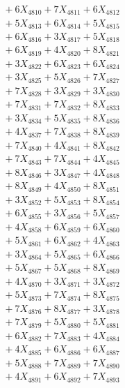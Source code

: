 \documentclass[a4paper,10pt]{article}
\begin{document}
{\begin{align}
&\;  + 6 X_{4810} + 7 X_{4811} + 6 X_{4812} \\[0.3ex]
&\;  + 5 X_{4813} + 6 X_{4814} + 5 X_{4815} \\[0.3ex]
&\;  + 6 X_{4816} + 3 X_{4817} + 5 X_{4818} \\[0.3ex]
&\;  + 6 X_{4819} + 4 X_{4820} + 8 X_{4821} \\[0.3ex]
&\;  + 3 X_{4822} + 6 X_{4823} + 6 X_{4824} \\[0.3ex]
&\;  + 3 X_{4825} + 5 X_{4826} + 7 X_{4827} \\[0.3ex]
&\;  + 7 X_{4828} + 3 X_{4829} + 3 X_{4830} \\[0.3ex]
&\;  + 7 X_{4831} + 7 X_{4832} + 8 X_{4833} \\[0.3ex]
&\;  + 3 X_{4834} + 5 X_{4835} + 8 X_{4836} \\[0.3ex]
&\;  + 4 X_{4837} + 7 X_{4838} + 8 X_{4839} \\[0.5ex]\allowbreak
&\;  + 7 X_{4840} + 4 X_{4841} + 8 X_{4842} \\[0.3ex]
&\;  + 7 X_{4843} + 7 X_{4844} + 4 X_{4845} \\[0.3ex]
&\;  + 8 X_{4846} + 3 X_{4847} + 4 X_{4848} \\[0.3ex]
&\;  + 8 X_{4849} + 4 X_{4850} + 8 X_{4851} \\[0.3ex]
&\;  + 3 X_{4852} + 5 X_{4853} + 8 X_{4854} \\[0.3ex]
&\;  + 6 X_{4855} + 3 X_{4856} + 5 X_{4857} \\[0.3ex]
&\;  + 4 X_{4858} + 6 X_{4859} + 6 X_{4860} \\[0.3ex]
&\;  + 5 X_{4861} + 6 X_{4862} + 4 X_{4863} \\[0.3ex]
&\;  + 3 X_{4864} + 5 X_{4865} + 6 X_{4866} \\[0.3ex]
&\;  + 5 X_{4867} + 5 X_{4868} + 8 X_{4869} \\[0.5ex]\allowbreak
&\;  + 4 X_{4870} + 3 X_{4871} + 3 X_{4872} \\[0.3ex]
&\;  + 5 X_{4873} + 7 X_{4874} + 8 X_{4875} \\[0.3ex]
&\;  + 7 X_{4876} + 8 X_{4877} + 3 X_{4878} \\[0.3ex]
&\;  + 7 X_{4879} + 5 X_{4880} + 5 X_{4881} \\[0.3ex]
&\;  + 6 X_{4882} + 7 X_{4883} + 4 X_{4884} \\[0.3ex]
&\;  + 4 X_{4885} + 6 X_{4886} + 6 X_{4887} \\[0.3ex]
&\;  + 5 X_{4888} + 7 X_{4889} + 7 X_{4890} \\[0.3ex]
&\;  + 4 X_{4891} + 6 X_{4892} + 7 X_{4893} \\[0.3ex]

\end{align}}
\end{document}
